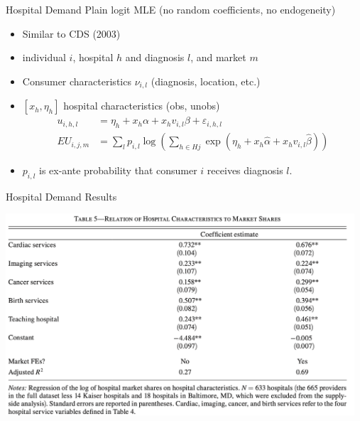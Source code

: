 \documentclass[xcolor=pdftex,dvipsnames,table,mathserif,aspectratio=169]{beamer}
\begin{document}
\begin{frame}{Hospital Demand}
Plain logit MLE (no random coefficients, no endogeneity)
\begin{itemize}
\item Similar to CDS (2003)
\item individual $i$, hospital $h$ and diagnosis $l$, and market $m$
\item Consumer characteristics $\nu_{i,l}$ (diagnosis, location, etc.)
\item $[x_h,\eta_h]$ hospital characteristics (obs, unobs)
\begin{align*}
u_{i, h, l}&=\eta_{h}+x_{h} \alpha+x_{h} v_{i, l} \beta+\varepsilon_{i, h, l} \\
E U_{i, j, m}&=\sum_{l} p_{i, l} \log \left(\sum_{h \in H j} \exp \left(\eta_{h}+x_{h} \hat{\alpha}+x_{h} v_{i, l} \hat{\beta}\right)\right)
\end{align*}
\item $p_{i,l}$ is ex-ante probability that consumer $i$ receives diagnosis $l$.
\end{itemize}
\end{frame}

\begin{frame}{Hospital Demand Results}
\begin{center}
\includegraphics[height=7.5cm]{./resources/ho_table5.png}
\end{center}
\end{frame}
\end{document}
